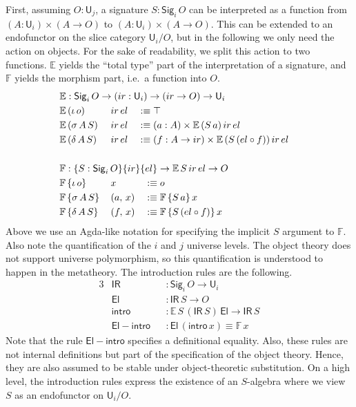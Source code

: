 \documentclass[acmsmall,screen,review,anonymous]{acmart}
\newcommand{\msf}[1]{{\mathsf{#1}}}
\newcommand{\mbb}[1]{\mathbb{#1}}
\newcommand{\U}{\msf{U}}
\newcommand{\El}{\msf{El}}
\newcommand{\Sig}{\msf{Sig}}
\newcommand{\ir}{{ir}}
\newcommand{\el}{{el}}
\newcommand{\IR}{\msf{IR}}
\newcommand{\intro}{\msf{intro}}
\newcommand{\E}{\mbb{E}}
\newcommand{\F}{\mbb{F}}
\begin{document}
First, assuming $O : \U_j$, a signature $S : \Sig_i\,O$ can be interpreted as a function from $(A : \U_i) \times (A \to O)$ to
$(A : \U_i) \times (A \to O)$. This can be extended to an endofunctor on the slice category
$\U_i/O$, but in the following we only need the action on objects. For the sake of readability, we
split this action to two functions. $\E$ yields the ``total type'' part of the interpretation of a
signature, and $\F$ yields the morphism part, i.e.\ a function into $O$.
\begin{alignat*}{3}
  &\rlap{$\E : \Sig_i\,O \to (\ir : \U_i) \to (\ir \to O) \to \U_i$} \\
  &\E\,(\iota\,o)    \,&&\ir\,\el && \hspace{-0.7em}:\equiv \top\\
  &\E\,(\sigma\,A\,S)\,&&\ir\,\el && \hspace{-0.7em}:\equiv (a : A) \times \E\,(S\,a)\,\ir\,\el\\
  &\E\,(\delta\,A\,S)\,&&\ir\,\el && \hspace{-0.7em}:\equiv (f : A \to \ir) \times \E\,(S\,(\el \circ f))\,\ir\,\el\\
  & && &&\\
  &\rlap{$\F : \{S : \Sig_i\,O\}\{\ir\}\{\el\} \to \E\,S\,\ir\,\el \to O$} \\
  &\F\,\{\iota\,o\}    \,&&x       && :\equiv o\\
  &\F\,\{\sigma\,A\,S\}\,&&(a,\,x) && :\equiv \F\,\{S\,a\}\,x\\
  &\F\,\{\delta\,A\,S\}\,&&(f,\,x) && :\equiv \F\,\{S\,(\el \circ f)\}\,x
\end{alignat*}
Above we use an Agda-like notation for specifying the implicit $S$ argument to $\F$. Also note the
quantification of the $i$ and $j$ universe levels. The object theory does not support universe
polymorphism, so this quantification is understood to happen in the metatheory. The introduction
rules are the following.
\begin{alignat*}{3}
  &\IR                && : \Sig_i\,O \to \U_i\\
  &\El                && : \IR\,S \to O\\
  &\intro             && : \E\,S\,(\IR\,S)\,\El \to \IR\,S\\
  &\msf{El\!\!-\!\!intro} && : \El\,(\intro\,x) \equiv \F\,x
\end{alignat*}
Note that the rule $\msf{El\!\!-\!\!intro}$ specifies a definitional equality. Also, these rules are
not internal definitions but part of the specification of the object theory. Hence, they are also
assumed to be stable under object-theoretic substitution. On a high level, the introduction rules
express the existence of an $S$-algebra where we view $S$ as an endofunctor on $\U_i/O$.
\end{document}
